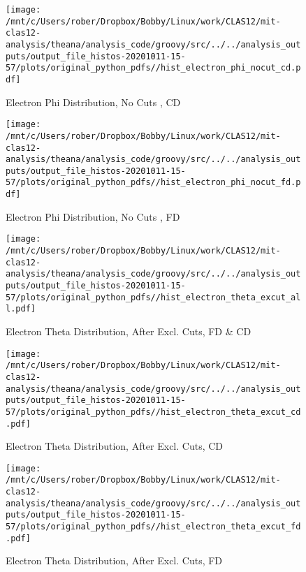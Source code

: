 \documentclass{article}
\begin{document}
\begin{landscape}
    \begin{figure}[h]
        \centering

        \texttt{[image: /mnt/c/Users/rober/Dropbox/Bobby/Linux/work/CLAS12/mit-clas12-analysis/theana/analysis\_code/groovy/src/../../analysis\_outputs/output\_file\_histos-20201011-15-57/plots/original\_python\_pdfs//hist\_electron\_phi\_nocut\_cd.pdf]}
        \captionsetup{textformat=empty,labelformat=blank}
        \caption{Electron Phi Distribution, No Cuts , CD}
    \end{figure}
    \clearpage
    
    \begin{figure}[h]
        \centering

        \texttt{[image: /mnt/c/Users/rober/Dropbox/Bobby/Linux/work/CLAS12/mit-clas12-analysis/theana/analysis\_code/groovy/src/../../analysis\_outputs/output\_file\_histos-20201011-15-57/plots/original\_python\_pdfs//hist\_electron\_phi\_nocut\_fd.pdf]}
        \captionsetup{textformat=empty,labelformat=blank}
        \caption{Electron Phi Distribution, No Cuts , FD}
    \end{figure}
    \clearpage
    
    \begin{figure}[h]
        \centering

        \texttt{[image: /mnt/c/Users/rober/Dropbox/Bobby/Linux/work/CLAS12/mit-clas12-analysis/theana/analysis\_code/groovy/src/../../analysis\_outputs/output\_file\_histos-20201011-15-57/plots/original\_python\_pdfs//hist\_electron\_theta\_excut\_all.pdf]}
        \captionsetup{textformat=empty,labelformat=blank}
        \caption{Electron Theta Distribution, After Excl. Cuts, FD \& CD}
    \end{figure}
    \clearpage
    
    \begin{figure}[h]
        \centering

        \texttt{[image: /mnt/c/Users/rober/Dropbox/Bobby/Linux/work/CLAS12/mit-clas12-analysis/theana/analysis\_code/groovy/src/../../analysis\_outputs/output\_file\_histos-20201011-15-57/plots/original\_python\_pdfs//hist\_electron\_theta\_excut\_cd.pdf]}
        \captionsetup{textformat=empty,labelformat=blank}
        \caption{Electron Theta Distribution, After Excl. Cuts, CD}
    \end{figure}
    \clearpage
    
    \begin{figure}[h]
        \centering

        \texttt{[image: /mnt/c/Users/rober/Dropbox/Bobby/Linux/work/CLAS12/mit-clas12-analysis/theana/analysis\_code/groovy/src/../../analysis\_outputs/output\_file\_histos-20201011-15-57/plots/original\_python\_pdfs//hist\_electron\_theta\_excut\_fd.pdf]}
        \captionsetup{textformat=empty,labelformat=blank}
        \caption{Electron Theta Distribution, After Excl. Cuts, FD}
    \end{figure}
    \clearpage
    

\end{landscape}
\end{document}
